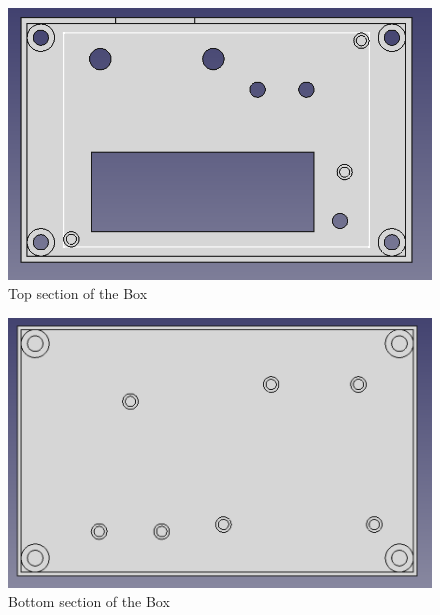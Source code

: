 \documentclass[a4paper,12pt]{article}
\begin{document}
\begin{figure}[H]
    \begin{center}
        \includegraphics[width=14cm]{images/top_container.PNG}
        \caption{Top section of the Box}
        \label{fig:topbox}
    \end{center}
\end{figure}
\begin{figure}[H]
    \begin{center}
        \includegraphics[width=14cm]{images/bottom_container.PNG}
        \caption{Bottom section of the Box}
        \label{fig:botbox}
    \end{center}
\end{figure}
\end{document}
